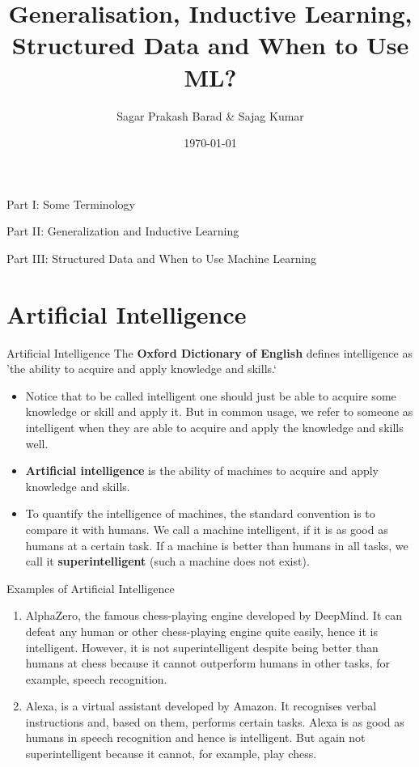 \documentclass[11pt,notheorems,hyperref={pdfauthor=whatever}]{beamer}
\title[]{Generalisation, Inductive Learning, Structured Data and When to Use ML?}
\author[]{Sagar Prakash Barad \& Sajag Kumar}
\institute{
    National Institute of Science Education and Research (NISER) \\ 
    Bhubaneswar}
\date{\today}
\begin{document}
{
\begin{frame}
  \titlepage
\end{frame}
}
\addtocounter{framenumber}{-1}

\begin{frame}{Part I: Some Terminology}
    \tableofcontents[part=1]
\end{frame}
\begin{frame}{Part II: Generalization and Inductive Learning}
    \tableofcontents[part=2]
\end{frame}
\begin{frame}{Part III: Structured Data and When to Use Machine Learning}
    \tableofcontents[part=3]
\end{frame}


\section{Artificial Intelligence}
\begin{frame}{Artificial Intelligence}
The \alert{\textbf{Oxford Dictionary of English}} defines intelligence as 'the ability to acquire and apply knowledge and skills.`
\begin{itemize}
    \item Notice that to be called intelligent one should just be able to acquire some knowledge or skill and apply it. But in common usage, we refer to someone as intelligent when they are able to acquire and apply the knowledge and skills well.
    \item \alert{\textbf{Artificial intelligence}} is the ability of machines to acquire and apply knowledge and skills.
    \item To quantify the intelligence of machines, the standard convention is to compare it with humans. We call a machine intelligent, if it is as good as humans at a certain task. If a machine is better than humans in all tasks, we call it \alert{\textbf{superintelligent}} (such a machine does not exist).
\end{itemize}
\end{frame}

\begin{frame}{Examples of Artificial Intelligence}
\begin{enumerate}
    \item \alert{AlphaZero}, the famous chess-playing engine developed by DeepMind. It can defeat any human or other chess-playing engine quite easily, hence it is intelligent. However, it is not superintelligent despite being better than humans at chess because it cannot outperform humans in other tasks, for example, speech recognition.
    \item \alert{Alexa}, is a virtual assistant developed by Amazon. It recognises verbal instructions and, based on them, performs certain tasks. Alexa is as good as humans in speech recognition and hence is intelligent. But again not superintelligent because it cannot, for example, play chess.
\end{enumerate}
\end{frame}
\end{document}
